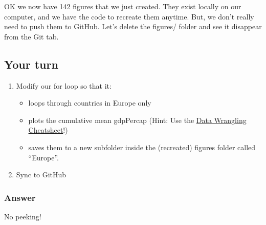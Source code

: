 \documentclass[]{book}
\providecommand{\tightlist}{%
  \setlength{\itemsep}{0pt}\setlength{\parskip}{0pt}}
\theoremstyle{definition}
\theoremstyle{definition}
\theoremstyle{definition}
\theoremstyle{remark}
\begin{document}
OK we now have 142 figures that we just created. They exist locally on
our computer, and we have the code to recreate them anytime. But, we
don't really need to push them to GitHub. Let's delete the figures/
folder and see it disappear from the Git tab.

\subsection{Your turn}\label{your-turn-12}

\begin{enumerate}
\def\labelenumi{\arabic{enumi}.}
\tightlist
\item
  Modify our for loop so that it:

  \begin{itemize}
  \tightlist
  \item
    loops through countries in Europe only
  \item
    plots the cumulative mean gdpPercap (Hint: Use the
    \href{https://www.rstudio.com/resources/cheatsheets/}{Data Wrangling
    Cheatsheet}!)
  \item
    saves them to a new subfolder inside the (recreated) figures folder
    called ``Europe''.
  \end{itemize}
\item
  Sync to GitHub
\end{enumerate}

\subsubsection{Answer}\label{answer-2}

No peeking!
\end{document}
